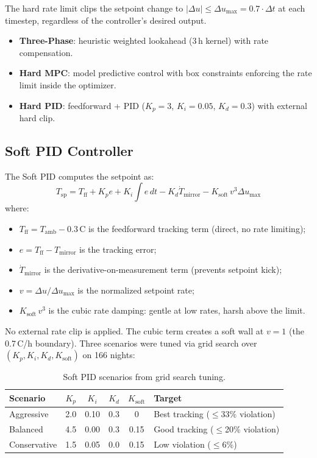 \documentclass[11pt]{article}
\begin{document}
The hard rate limit clips the setpoint change to
$|\Delta u| \leq \Delta u_\mathrm{max} = 0.7 \cdot \Delta t$ at each timestep,
regardless of the controller's desired output.

\begin{itemize}
  \item \textbf{Three-Phase}: heuristic weighted lookahead (3\,h kernel) with
    rate compensation.
  \item \textbf{Hard MPC}: model predictive control with box constraints
    enforcing the rate limit inside the optimizer.
  \item \textbf{Hard PID}: feedforward + PID ($K_p=3$, $K_i=0.05$, $K_d=0.3$)
    with external hard clip.
\end{itemize}

\subsection{Soft PID Controller}

The Soft PID computes the setpoint as:
\begin{equation}
  T_\mathrm{sp} = T_\mathrm{ff} + K_p e + K_i \int e\,dt
    - K_d \dot{T}_\mathrm{mirror} - K_\mathrm{soft}\, v^3 \Delta u_\mathrm{max}
\end{equation}
where:
\begin{itemize}
  \item $T_\mathrm{ff} = T_\mathrm{amb} - 0.3$\,\textdegree C is the
    feedforward tracking term (direct, no rate limiting);
  \item $e = T_\mathrm{ff} - T_\mathrm{mirror}$ is the tracking error;
  \item $\dot{T}_\mathrm{mirror}$ is the derivative-on-measurement term
    (prevents setpoint kick);
  \item $v = \Delta u / \Delta u_\mathrm{max}$ is the normalized setpoint rate;
  \item $K_\mathrm{soft}\, v^3$ is the cubic rate damping: gentle at low rates,
    harsh above the limit.
\end{itemize}

No external rate clip is applied.  The cubic term creates a soft wall at
$v = 1$ (the 0.7\,\textdegree C/h boundary).  Three scenarios were tuned via
grid search over $(K_p, K_i, K_d, K_\mathrm{soft})$ on 166 nights:

\begin{table}[htbp]
\centering
\caption{Soft PID scenarios from grid search tuning.}
\label{tab:pid_scenarios}
\begin{tabular}{lccccl}
\toprule
Scenario & $K_p$ & $K_i$ & $K_d$ & $K_\mathrm{soft}$ & Target \\
\midrule
Aggressive    & 2.0 & 0.10 & 0.3 & 0    & Best tracking ($\leq$33\% violation) \\
Balanced      & 4.5 & 0.00 & 0.3 & 0.15 & Good tracking ($\leq$20\% violation) \\
Conservative  & 1.5 & 0.05 & 0.0 & 0.15 & Low violation ($\leq$6\%) \\
\bottomrule
\end{tabular}
\end{table}
\end{document}

